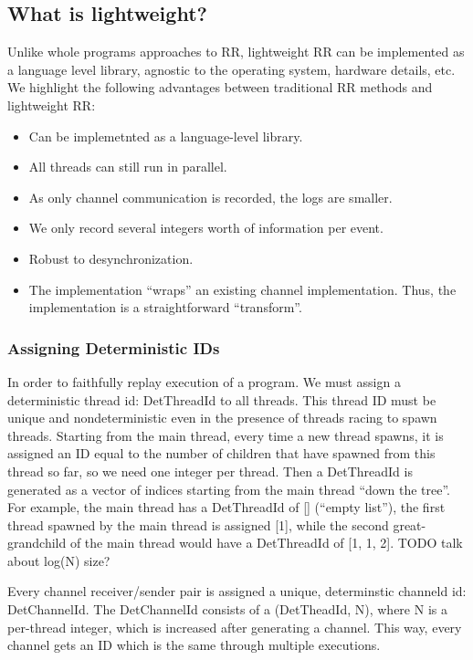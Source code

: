 \documentclass{article}
\begin{document}
\subsection{What is lightweight?}
Unlike whole programs
approaches to RR, lightweight RR can be implemented as a language level library,
agnostic to the operating system, hardware details, etc.
We highlight the following advantages between traditional RR methods and lightweight RR:
\begin{itemize}
\item Can be implemetnted as a language-level library.
\item All threads can still run in parallel.
\item As only channel communication is recorded, the logs are smaller.
\item We only record several integers worth of information per event.
\item Robust to desynchronization.
\item The implementation ``wraps'' an existing channel implementation. Thus, the
  implementation is a straightforward ``transform''.
\end{itemize}

\subsubsection{Assigning Deterministic IDs}
In order to faithfully replay execution of a program. We must assign a deterministic
thread id: DetThreadId to all threads. This thread ID must be unique and nondeterministic
even in the presence of threads racing to spawn threads. Starting from the main thread,
every time a new thread spawns, it is assigned an ID equal to the number of children that
have spawned from this thread so far, so we need one integer per thread. Then a DetThreadId
is generated as a vector of indices starting from the main thread ``down the tree''. For
example, the main thread has a DetThreadId of [] (``empty list''), the first thread spawned
by the main thread is assigned [1], while the second great-grandchild of the main thread
would have a DetThreadId of [1, 1, 2]. TODO talk about log(N) size?

Every channel receiver/sender pair is assigned a unique, determinstic channeld id:
DetChannelId. The DetChannelId consists of a (DetTheadId, N), where N is a per-thread
integer, which is increased after generating a channel. This way, every channel gets
an ID which is the same through multiple executions.
\end{document}
